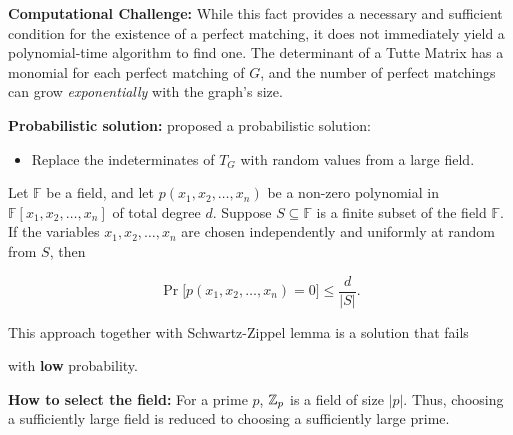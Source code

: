 \documentclass[a1paper,brazilian,english]{article}
\begin{document}
\begin{tcbposter}[
  poster = {
    rows = 6,
    columns = 12,
    colspacing = 1.2cm,
    rowspacing = .8cm,
  },
]
{\textbf{Computational Challenge:} While this fact provides a necessary and sufficient condition for the existence of a perfect matching, it does not immediately yield a polynomial-time algorithm to find one. 
The determinant of a Tutte Matrix has a monomial for each perfect matching of \(G\),
and the number of perfect matchings can grow \emph{exponentially} with the graph's size.

\textbf{Probabilistic solution:} \citet{Lovasz:Random} proposed a probabilistic solution:
\begin{itemize}
  \item Replace the indeterminates of \(T_G\) with random values from a large field.
\end{itemize}

\begin{lemma*}
Let \(\mathbb{F}\) be a field, and let \(p(x_1, x_2, \dots, x_n)\) be a non-zero polynomial in \(\mathbb{F}[x_1, x_2, \dots, x_n]\) of total degree \(d\). 
Suppose \(S \subseteq \mathbb{F}\) is a finite subset of the field \( \mathbb{F} \). 
If the variables \(x_1, x_2, \dots, x_n\) are chosen independently and uniformly at random from \( S \), then

\[
\Pr\big[p(x_1, x_2, \dots, x_n) = 0\big] \leq \frac{d}{|S|}.
\]
\end{lemma*}

This approach together with Schwartz-Zippel lemma is a solution that fails 

with \textbf{low} probability.

\textbf{How to select the field:} For a prime \(p\), \(\mathbb{Z}_{p}\) is a field of size \(|p|\).
Thus, choosing a sufficiently large field is reduced to choosing a sufficiently large prime.
}

\end{tcbposter}
\end{document}
